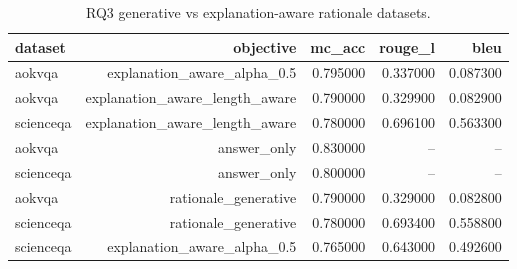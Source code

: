 \begin{table}
\caption{RQ3 generative vs explanation-aware rationale datasets.}
\label{tab:rq3_objective}
\begin{tabular}{lrrrr}
\toprule
dataset & objective & mc_acc & rouge_l & bleu \\
\midrule
aokvqa & explanation_aware_alpha_0.5 & 0.795000 & 0.337000 & 0.087300 \\
aokvqa & explanation_aware_length_aware & 0.790000 & 0.329900 & 0.082900 \\
scienceqa & explanation_aware_length_aware & 0.780000 & 0.696100 & 0.563300 \\
aokvqa & answer_only & 0.830000 & -- & -- \\
scienceqa & answer_only & 0.800000 & -- & -- \\
aokvqa & rationale_generative & 0.790000 & 0.329000 & 0.082800 \\
scienceqa & rationale_generative & 0.780000 & 0.693400 & 0.558800 \\
scienceqa & explanation_aware_alpha_0.5 & 0.765000 & 0.643000 & 0.492600 \\
\bottomrule
\end{tabular}
\end{table}
